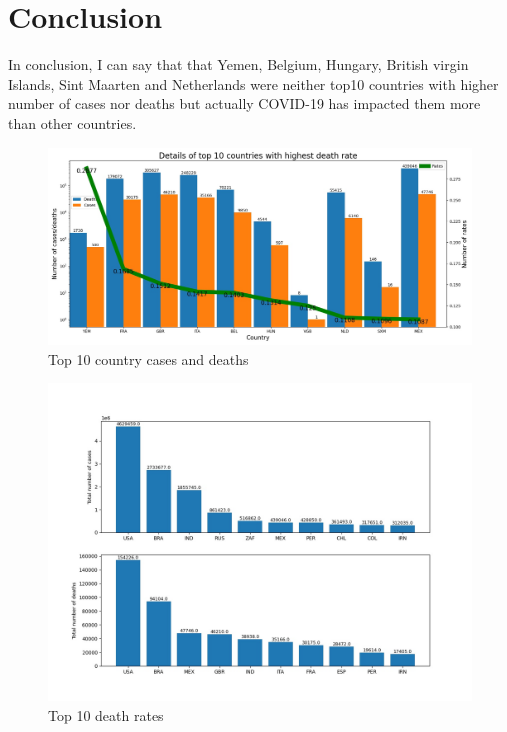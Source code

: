 \documentclass[12pt, letterpaper]{article}
\begin{document}
\section{Conclusion }

In conclusion, I can say that that Yemen, Belgium, Hungary, British virgin Islands, Sint Maarten and Netherlands were neither top10 countries with higher number of cases nor deaths but actually COVID-19 has impacted them more than other countries.  

 \begin{figure}[h]
    \centering
    \includegraphics[width=1.1\textwidth]{plot1}
    \caption{Top 10 country cases and deaths}
    \label{fig:plot1}
\end{figure}


\begin{figure}[h]
    \centering
    \includegraphics[width=1\textwidth]{plot2}
    \caption{Top 10 death rates}
    \label{fig:plot2}
\end{figure}
\end{document}

